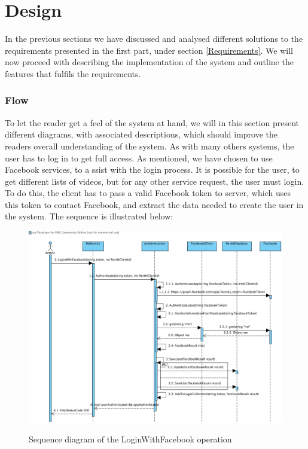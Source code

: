 \part{Design}
In the previous sections we have discussed and analysed different solutions to the requirements presented in the first part, under section \ref{Requirements}. We will now proceed with describing the implementation of the system and outline the features that fulfils the requirements.

\section{Flow}
To let the reader get a feel of the system at hand, we will in this section present different diagrams, with associated descriptions, which should improve the readers overall understanding of the system.
As with many others systems, the user has to log in to get full access. As mentioned, we have chosen to use Facebook services, to a ssist with the login process. It is possible for the user, to get different lists of videos, but for any other service request, the user must login. To do this, the client has to pass a valid Facebook token to server, which uses this token to contact Facebook, and extract the data needed to create the user in the system. The sequence is illustrated below:

\begin{figure}[H]
\centering
\includegraphics[scale=0.35]{loginWithFacebook.jpg}
\label{loginwithfacebook}
\caption{Sequence diagram of the LoginWithFacebook operation}
\end{figure}


